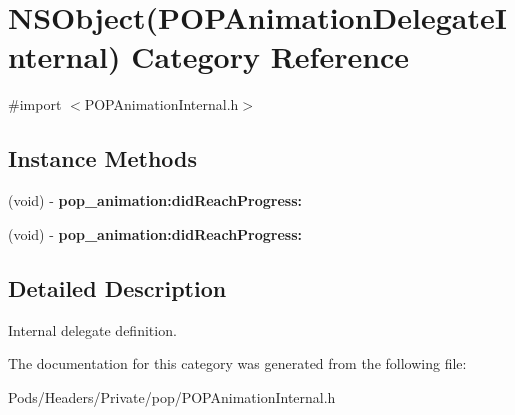 \hypertarget{category_n_s_object_07_p_o_p_animation_delegate_internal_08}{}\section{N\+S\+Object(P\+O\+P\+Animation\+Delegate\+Internal) Category Reference}
\label{category_n_s_object_07_p_o_p_animation_delegate_internal_08}


{\ttfamily \#import $<$P\+O\+P\+Animation\+Internal.\+h$>$}

\subsection*{Instance Methods}
\begin{DoxyCompactItemize}
\item 
\mbox{\label{category_n_s_object_07_p_o_p_animation_delegate_internal_08_aea4e9623b0f58aa9f26b4aa911f4286e}} 
(void) -\/ {\bfseries pop\+\_\+animation\+:did\+Reach\+Progress\+:}
\item 
\mbox{\label{category_n_s_object_07_p_o_p_animation_delegate_internal_08_aea4e9623b0f58aa9f26b4aa911f4286e}} 
(void) -\/ {\bfseries pop\+\_\+animation\+:did\+Reach\+Progress\+:}
\end{DoxyCompactItemize}


\subsection{Detailed Description}
Internal delegate definition. 

The documentation for this category was generated from the following file\+:\begin{DoxyCompactItemize}
\item 
Pods/\+Headers/\+Private/pop/P\+O\+P\+Animation\+Internal.\+h\end{DoxyCompactItemize}
